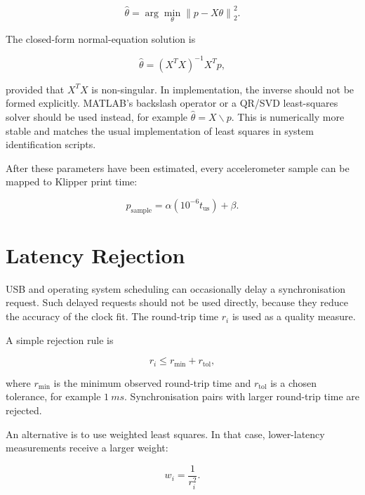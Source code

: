 \documentclass[11pt,a4paper]{article}
\begin{document}
\begin{equation}
    \hat{\theta}
    =
    \arg\min_{\theta} \left\|p - X\theta\right\|_2^2.
\end{equation}

The closed-form normal-equation solution is

\begin{equation}
    \hat{\theta} = (X^T X)^{-1} X^T p,
    \label{eq:matrix_ls}
\end{equation}

provided that \(X^T X\) is non-singular. In implementation, the inverse should
not be formed explicitly. MATLAB's backslash operator or a QR/SVD least-squares
solver should be used instead, for example \(\hat{\theta} = X \backslash p\).
This is numerically more stable and matches the usual implementation of least
squares in system identification scripts.

After these parameters have been estimated, every accelerometer sample can be
mapped to Klipper print time:

\begin{equation}
    p_{\mathrm{sample}} =
    \alpha \left(10^{-6} t_{\mathrm{us}}\right) + \beta.
    \label{eq:sample_mapping}
\end{equation}

\section{Latency Rejection}

USB and operating system scheduling can occasionally delay a synchronisation
request. Such delayed requests should not be used directly, because they reduce
the accuracy of the clock fit. The round-trip time \(r_i\) is used as a quality
measure.

A simple rejection rule is

\begin{equation}
    r_i \leq r_{\min} + r_{\mathrm{tol}},
\end{equation}

where \(r_{\min}\) is the minimum observed round-trip time and
\(r_{\mathrm{tol}}\) is a chosen tolerance, for example
\(\SI{1}{ms}\). Synchronisation pairs with larger round-trip time are rejected.

An alternative is to use weighted least squares. In that case, lower-latency
measurements receive a larger weight:

\begin{equation}
    w_i = \frac{1}{r_i^2}.
\end{equation}
\end{document}
